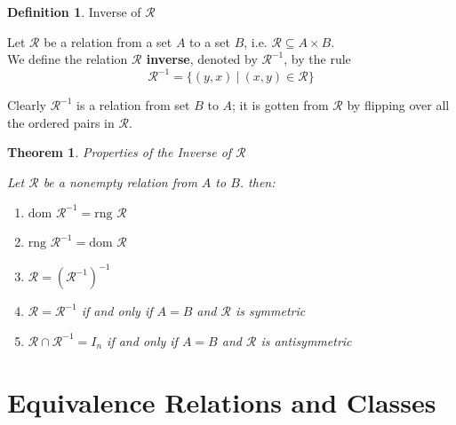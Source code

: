\documentclass{book}
\newtheorem{theorem}{Theorem}[section]
\theoremstyle{definition}
\newtheorem{definition}{Definition}[section]
\theoremstyle{remark}
\newcommand{\cc}[1]{\mathcal{#1}}
\begin{document}
    \newpage
    \begin{definition} 
        Inverse of $\cc{R}$ \\
        
        \begin{tcolorbox}      
            Let $\cc{R}$ be a relation from a set $A$ to a set $B$, i.e. $\cc{R} \subseteq A \times B$. \\
            We define the relation \textbf{$\cc{R}$ inverse}, denoted by $\cc{R}^{-1}$, by the rule
                \begin{equation*}
                    \cc{R}^{-1} = \{ (y,x) \:|\: (x,y) \in \cc{R} \}
                \end{equation*}
        \end{tcolorbox} 
    \end{definition}

    Clearly $\cc{R}^{-1}$ is a relation from set $B$ to $A$; it is gotten from $\cc{R}$ by flipping over all the ordered pairs in $\cc{R}$. 

   \begin{theorem} 
        Properties of the Inverse of $\cc{R}$ \\
        
        \begin{tcolorbox}      
            Let $\cc{R}$ be a nonempty relation from $A$ to $B$. then: 
                \begin{enumerate}
                    \item $\text{dom } \cc{R}^{-1} = \text{rng } \cc{R}$
                    
                    \item $\text{rng } \cc{R}^{-1} = \text{dom } \cc{R}$
                    
                    \item $\cc{R} = (\cc{R}^{-1})^{-1}$
                    
                    \item $\cc{R} = \cc{R}^{-1}$ if and only if $A=B$ and $\cc{R}$ is symmetric
                    
                    \item $\cc{R} \cap \cc{R}^{-1} = I_n$ if and only if $A=B$ and $\cc{R}$ is antisymmetric
                \end{enumerate}
        \end{tcolorbox} 
    \end{theorem}


\newpage
\section{Equivalence Relations and Classes}
\end{document}
